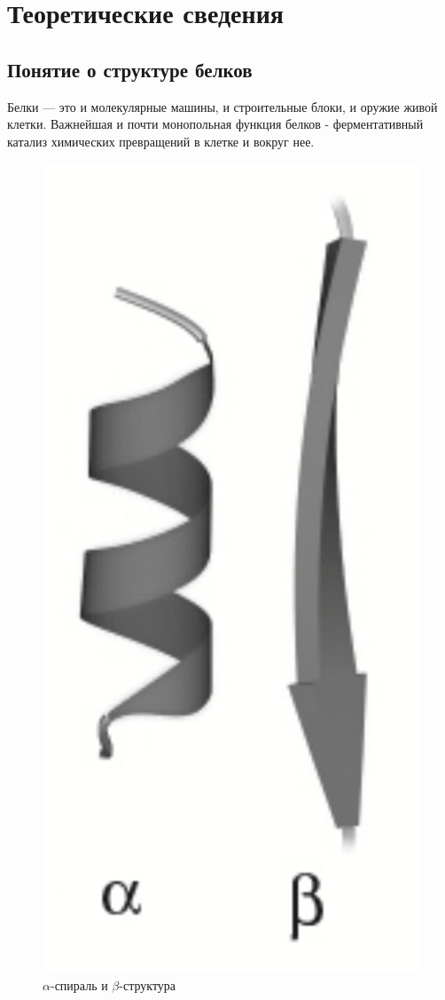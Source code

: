 \documentclass[
11pt,%
tightenlines,%
twoside,%
onecolumn,%
nofloats,%
nobibnotes,%
nofootinbib,%
superscriptaddress,%
noshowpacs,%
centertags]%
{revtex4}
\begin{document}
\section{Теоретические сведения}
\subsection{Понятие о структуре белков}
Белки — это и молекулярные машины, и строительные блоки, и оружие живой клетки. Важнейшая и почти монопольная функция белков - ферментативный катализ химических превращений в клетке и вокруг нее. 

\begin{figure}
	\centering
	\includegraphics[scale=0.3]{alpha}
	\caption{$\alpha$-спираль и $\beta$-структура}
\end{figure}
\end{document}

